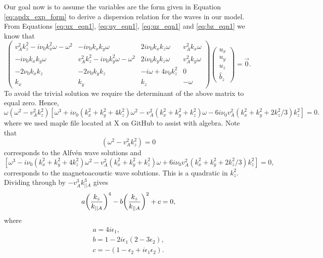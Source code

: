 Our goal now is to assume the variables are the form given in Equation \eqref{eq:apdx_exp_form} to derive a dispersion relation for the waves in our model. From Equations \eqref{eq:ux_eqn1}, \eqref{eq:uy_eqn1}, \eqref{eq:uz_eqn1} and \eqref{eq:bz_eqn1} we know that
\[\begin{pmatrix}
v_A^2k_z^2 - i\nu_0 k_x^2 \omega  -\omega^2 & -i\nu_0 k_xk_y\omega & 2i\nu_0 k_xk_z\omega & v_A^2 k_x \omega \\
-i\nu_0 k_xk_y\omega & v_A^2k_z^2 - i\nu_0 k_y^2 \omega  -\omega^2 & 2i\nu_0 k_yk_z\omega & v_A^2 k_y \omega \\
-2\nu_0 k_xk_z & -2\nu_0 k_y k_z & -i\omega + 4\nu_0 k_z^2 & 0 \\
k_x & k_y & k_z & -\omega
\end{pmatrix}
\begin{pmatrix}
u_x \\
u_y \\
u_z \\
\hat{b}_z
\end{pmatrix}
=\vec{0}.\]
To avoid the trivial solution we require the determinant of the above matrix to equal zero. Hence,
\[\omega(\omega^2 - v_A^2k_z^2)[\omega^3+i\nu_0(k_x^2 + k_y^2 + 4k_z^2)\omega^2 - v_A^2(k_x^2+k_y^2+k_z^2)\omega - 6i\nu_0 v_A^2(k_x^2+k_y^2+2k_z^2/3)k_z^2]=0.\]
where we used maple file located at X on GitHub to assist with algebra.
Note that 
\[(\omega^2 - v_A^2k_z^2)=0\]
corresponds to the Alfv\'en wave solutions and 
\[[\omega^3-i\nu_0(k_x^2 + k_y^2 + 4k_z^2)\omega^2 - v_A^2(k_x^2+k_y^2+k_z^2)\omega + 6i\nu_0 v_A^2(k_x^2+k_y^2+2k_z^2/3)k_z^2]=0,\]
corresponds to the magnetoacoustic wave solutions.
This is a quadratic in $k_z^2$. Dividing through by $-v_A^3k_{||A}^3$ gives
\begin{equation}
    a\qty(\frac{k_z}{k_{||A}})^4 - b \qty(\frac{k_z}{k_{||A}})^2 + c = 0,
\end{equation}
where
\begin{gather}
    a = 4i\epsilon_1, \\
    b = 1 - 2i\epsilon_1(2-3\epsilon_2), \\
    c = -(1 - \epsilon_2 + i\epsilon_1\epsilon_2).
\end{gather}
